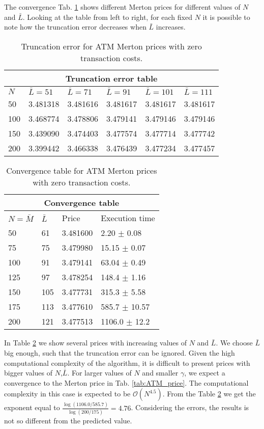The convergence Tab. \ref{tab:convergence2} shows different Merton prices for different values of $N$ and $\bar L$.
Looking at the table from left to right, for each fixed $N$ it is possible to note how the truncation error decreases when $\bar L$ increases.
\begin{table}[ht]
\centering
 \begin{tabular}{*{6}l}
 \toprule
  \multicolumn{6}{c}{\textbf{Truncation error table}} \\
  \midrule
  $N$ & $\bar L=51$ &   $\bar L=71$   & $\bar L=91$ & $\bar L=101$ & $\bar L=111$ \\
  \midrule
    50   & 3.481318 & 3.481616 & 3.481617 & 3.481617 & 3.481617  \\
    100  & 3.468774 & 3.478806 & 3.479141 & 3.479146 & 3.479146  \\
    150  & 3.439090 & 3.474403 & 3.477574 & 3.477714 & 3.477742  \\
    200  & 3.399442 & 3.466338 & 3.476439 & 3.477234 & 3.477457 \\
  \bottomrule
  \end{tabular}
  \caption{Truncation error for ATM Merton prices with zero transaction costs.}
  \label{tab:convergence2}
\end{table}

\begin{table}[ht]
\centering
 \begin{tabular}{llll}
 \toprule
  \multicolumn{4}{c}{\textbf{Convergence table}} \\
  \midrule
  $N = \bar M$ & $\bar L$ & Price & Execution time \\
  \midrule
    50  & 61  & 3.481600 & 2.20 $\pm$ 0.08 \\
    75  & 75  & 3.479980 & 15.15 $\pm$ 0.07 \\
    100 & 91  & 3.479141 & 63.04 $\pm$ 0.49 \\
    125 & 97  & 3.478254 & 148.4 $\pm$ 1.16 \\
    150 & 105 & 3.477731 & 315.3 $\pm$ 5.58 \\
    175 & 113 & 3.477610 & 585.7 $\pm$ 10.57 \\ 
    200 & 121 & 3.477513 & 1106.0 $\pm$ 12.2 \\
  \bottomrule
  \end{tabular}
  \caption{Convergence table for ATM Merton prices with zero transaction costs.}
  \label{tab:convergence3}
\end{table}


In Table \ref{tab:convergence3} we show several prices with increasing values of $N$ and $\bar L$. We choose $\bar L$ big enough, such that the truncation error can be ignored.
Given the high computational complexity of the algorithm, 
it is difficult to present prices with bigger values of $N$,$\bar L$. For larger values of $N$ and smaller $\gamma$, we expect a convergence to the Merton price in Tab. 
\ref{tab:ATM_price}. 
The computational complexity in this case is expected to be $\mathcal{O}(N^{4.5})$. From the Table \ref{tab:convergence3} we get 
the exponent equal to $\frac{\log(1106.0/585.7)}{\log(200/175)} = 4.76$. Considering the errors, the results is not so different from the predicted value.


